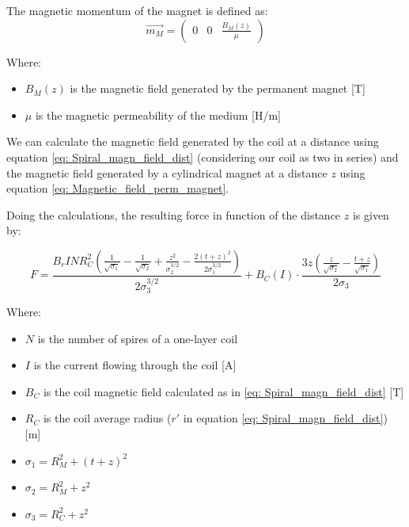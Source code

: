 \begin{samepage}
    The magnetic momentum of the magnet is defined as:
    \begin{equation}
        \overrightarrow{m_M} = 
        \begin{pmatrix}
            0 & 0 & \frac{B_M(z)}{\mu}
        \end{pmatrix}
    \end{equation}
    \nopagebreak

    Where:
    \begin{itemize}
        \item $B_M(z)$ is the magnetic field generated by the permanent magnet [T]
        \item $\mu$ is the magnetic permeability of the medium [H/m]
    \end{itemize}
\end{samepage}

We can calculate the magnetic field generated by the coil at a distance using equation \ref{eq: Spiral_magn_field_dist} (considering our coil as two in series) and the magnetic field generated by a cylindrical magnet at a distance $z$ using equation \ref{eq: Magnetic_field_perm_magnet}.

\begin{samepage}
    Doing the calculations, the resulting force in function of the distance $z$ is given by:
    \nopagebreak

    \begin{equation}
        F = \frac{ B_r I N R_C^2 \left(\frac{1}{\sqrt{\sigma_1}} - \frac{1}{\sqrt{\sigma_2}} + \frac{z^2}{\sigma_2^{3/2}} - \frac{2(t+z)^2}{2\sigma_1^{3/2}}\right)}{2\sigma_3^{3/2}} + B_C(I) \cdot \frac{3z \left(\frac{z}{\sqrt{\sigma_2}} - \frac{t+z}{\sqrt{\sigma_1}}\right)}{2\sigma_3}
    \end{equation}
    \nopagebreak

    Where:
    \nopagebreak

    \begin{itemize}
        \item $N$ is the number of spires of a one-layer coil
        \item $I$ is the current flowing through the coil [A]
        \item $B_C$ is the coil magnetic field calculated as in \ref{eq: Spiral_magn_field_dist} [T]
        \item $R_C$ is the coil average radius ($r'$ in equation \ref{eq: Spiral_magn_field_dist}) [m]
        \item $\sigma_1 = R_M^2 + (t+z)^2$
        \item $\sigma_2 = R_M^2 + z^2$
        \item $\sigma_3 = R_C^2 + z^2$    
    \end{itemize}
\end{samepage}

